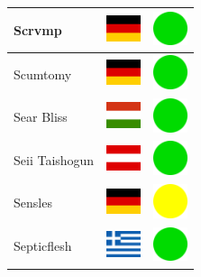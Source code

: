 \documentclass[12pt, a4paper, twoside]{report}
\begin{document}
\begin{center}
\begin{longtable}{|p{5cm}|p{2cm}|p{2cm}|}
 Scrvmp                                                     & \includegraphics[width=1cm]{../img/flags/de} &   \includegraphics[width=1cm]{../likes/y} \\ \hline
 Scumtomy                                                   & \includegraphics[width=1cm]{../img/flags/de} &   \includegraphics[width=1cm]{../likes/y} \\ \hline
 Sear Bliss                                                 & \includegraphics[width=1cm]{../img/flags/hu} &   \includegraphics[width=1cm]{../likes/y} \\ \hline
 Seii Taishogun                                             & \includegraphics[width=1cm]{../img/flags/at} &   \includegraphics[width=1cm]{../likes/y} \\ \hline
 Sensles                                                    & \includegraphics[width=1cm]{../img/flags/de} &   \includegraphics[width=1cm]{../likes/m} \\ \hline
 Septicflesh                                                & \includegraphics[width=1cm]{../img/flags/gr} &   \includegraphics[width=1cm]{../likes/y} \\ \hline

\end{longtable}
\end{center}
\end{document}
